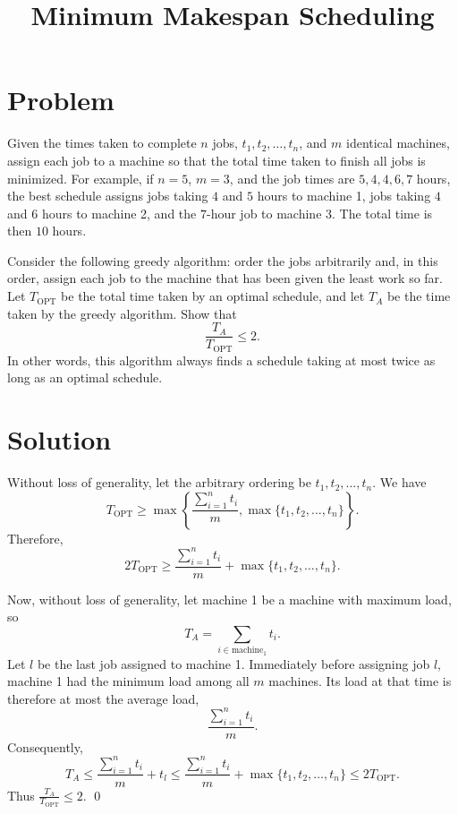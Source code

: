 \documentclass[11pt]{article}
\title{Minimum Makespan Scheduling}
\author{}
\date{}
\begin{document}
\maketitle

\section*{Problem}
Given the times taken to complete $n$ jobs, $t_1,t_2,\dots,t_n$, and $m$ identical machines, assign each job to a machine so that the total time taken to finish all jobs is minimized. For example, if $n=5$, $m=3$, and the job times are $5,4,4,6,7$ hours, the best schedule assigns jobs taking $4$ and $5$ hours to machine 1, jobs taking $4$ and $6$ hours to machine 2, and the $7$-hour job to machine 3. The total time is then $10$ hours.

Consider the following greedy algorithm: order the jobs arbitrarily and, in this order, assign each job to the machine that has been given the least work so far. Let $T_{\mathrm{OPT}}$ be the total time taken by an optimal schedule, and let $T_A$ be the time taken by the greedy algorithm. Show that
\[
  \frac{T_A}{T_{\mathrm{OPT}}} \leq 2.
\]
In other words, this algorithm always finds a schedule taking at most twice as long as an optimal schedule.

\section*{Solution}
Without loss of generality, let the arbitrary ordering be $t_1,t_2,\dots,t_n$. We have
\[
  T_{\mathrm{OPT}}
  \geq \max\left\{\frac{\sum_{i=1}^n t_i}{m}, \max\{t_1,t_2,\dots,t_n\}\right\}.
\]
Therefore,
\[
  2T_{\mathrm{OPT}}
  \geq \frac{\sum_{i=1}^n t_i}{m} + \max\{t_1,t_2,\dots,t_n\}.
\]

Now, without loss of generality, let machine 1 be a machine with maximum load, so
\[
  T_A=\sum_{i\in \mathrm{machine}_1} t_i.
\]
Let $l$ be the last job assigned to machine 1. Immediately before assigning job $l$, machine 1 had the minimum load among all $m$ machines. Its load at that time is therefore at most the average load,
\[
  \frac{\sum_{i=1}^n t_i}{m}.
\]
Consequently,
\[
  T_A \leq \frac{\sum_{i=1}^n t_i}{m}+t_l
  \leq \frac{\sum_{i=1}^n t_i}{m}+\max\{t_1,t_2,\dots,t_n\}
  \leq 2T_{\mathrm{OPT}}.
\]
Thus $\frac{T_A}{T_{\mathrm{OPT}}}\leq 2$. \qed
\end{document}
